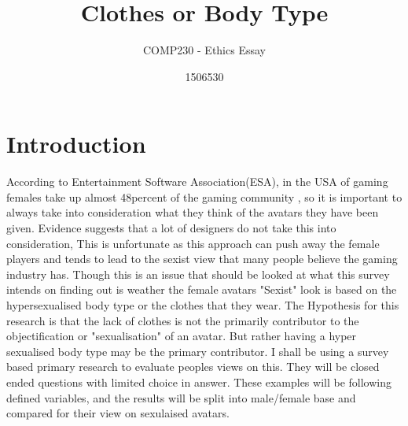 \documentclass{scrartcl}
\title{Clothes or Body Type}
\subtitle{COMP230 - Ethics Essay}
\author{1506530}
\begin{document}
\maketitle

	
\newpage

\section{Introduction}

According to Entertainment Software Association(ESA), in the USA of gaming females take up almost 48percent of the gaming community \cite{SexistGames}, so it is important to always take into consideration what they think of the avatars they have been given. Evidence suggests that a lot of designers do not take this into consideration, This is unfortunate as this approach can push away the female players and tends to lead to the sexist view that many people believe the gaming industry has. Though this is an issue that should be looked at what this survey intends on finding out is weather the female avatars "Sexist" look is based on the hypersexualised body type or the clothes that they wear.
		\newline
The Hypothesis for this research is that the lack of clothes is not the primarily contributor to the objectification or "sexualisation" of an avatar. But rather having a hyper sexualised body type may be the primary contributor. I shall be using a survey based primary research to evaluate peoples views on this. They will be closed ended questions with limited choice in answer. These examples will be following defined variables, and the results will be split into male/female base and compared for their view on sexulaised avatars.
\end{document}

